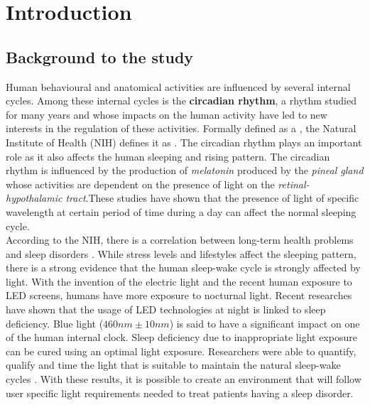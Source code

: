 \chapter{Introduction}\label{introduction}

\section{Background to the study}

Human behavioural and anatomical activities are influenced by several internal cycles. Among these internal cycles is the \textbf{circadian rhythm}, a rhythm studied for many years and whose impacts on the human activity have led to new interests in the regulation of these activities. Formally defined as a  \cite{ge2014}, the Natural Institute of Health (NIH) defines it as \cite{ge2014}. The circadian rhythm plays an important role as it also affects the human sleeping and rising pattern. The circadian rhythm is influenced by the production of \textit{melatonin} produced by the \textit{pineal gland} whose activities are dependent on the presence of light on the \textit{retinal-hypothalamic tract}\cite{lig1994}.These studies have shown that the presence of light of specific wavelength at certain period of time during a day can affect the normal sleeping cycle.\\   
According to the NIH, there is a correlation between long-term health problems and sleep disorders \cite{ph2002}. While stress levels and lifestyles affect the sleeping pattern, there is a strong evidence that the human sleep-wake cycle is strongly affected by light. With the invention of the electric light and the recent human exposure to LED screens, humans have more exposure to nocturnal light. Recent researches have shown that the usage of LED technologies at night is linked to sleep deficiency. Blue light ($460nm\pm10nm$) is said to have a significant impact on one of the human internal clock\cite{bl2010}. Sleep deficiency due to inappropriate light exposure can be cured using an optimal light exposure\cite{bl2010}. Researchers were able to quantify, qualify and time the light that is suitable to maintain the natural sleep-wake cycles \cite{cir2014}. With these results, it is possible to create an environment that will follow user specific light requirements needed to treat patients having a sleep disorder.


